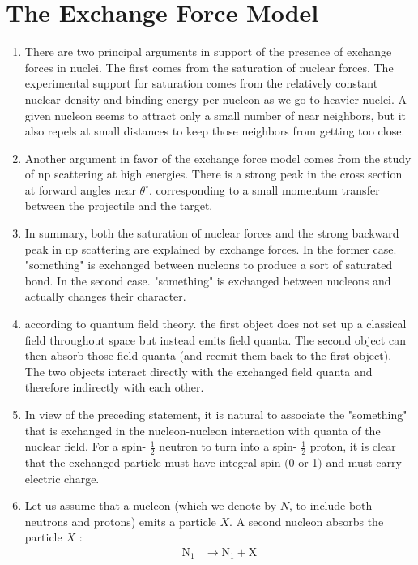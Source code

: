  \section{The Exchange Force Model}
 \begin{enumerate}
 	\item There are two principal arguments in support of the presence of exchange forces in nuclei. The first comes from the saturation of nuclear forces. The experimental support for saturation comes from the relatively constant nuclear density and binding energy per nucleon as we go to heavier nuclei. A given nucleon seems to attract only a small number of near neighbors, but it also repels at small distances to keep those neighbors from getting too close.
 	\item Another argument in favor of the exchange force model comes from the study of $\mathrm{np}$ scattering at high energies. There is a strong peak in the cross section at forward angles near $\theta^{\circ}$. corresponding to a small momentum transfer between the projectile and the target. 
 	\item In summary, both the saturation of nuclear forces and the strong backward peak in np scattering are explained by exchange forces. In the former case. "something" is exchanged between nucleons to produce a sort of saturated bond. In the second case. "something" is exchanged between nucleons and actually changes their character.
 	\item according to quantum field theory. the first object does not set up a classical field throughout space but instead emits field quanta. The second object can then absorb those field quanta (and reemit them back to the first object). The two objects interact directly with the exchanged field quanta and therefore indirectly with each other.
 	\item In view of the preceding statement, it is natural to associate the "something" that is exchanged in the nucleon-nucleon interaction with quanta of the nuclear field. For a spin- $\frac{1}{2}$ neutron to turn into a spin- $\frac{1}{2}$ proton, it is clear that the exchanged particle must have integral spin $(0$ or 1$)$ and must carry electric charge.
 	\item  Let us assume that a nucleon (which we denote by $N$, to include both neutrons and protons) emits a particle $X$. A second nucleon absorbs the particle $X$ :
 	$$
 	\begin{aligned}
 	\mathrm{N}_{1} & \rightarrow \mathrm{N}_{1}+\mathrm{X} \\

\end{aligned}$$
\end{enumerate}
